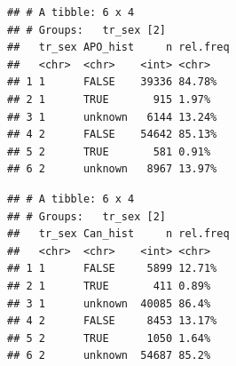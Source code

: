 \documentclass[]{article}
\newenvironment{Shaded}{\begin{snugshade}}{\end{snugshade}}
\newcommand{\DataTypeTok}[1]{\textcolor[rgb]{0.13,0.29,0.53}{#1}}
\newcommand{\DecValTok}[1]{\textcolor[rgb]{0.00,0.00,0.81}{#1}}
\newcommand{\KeywordTok}[1]{\textcolor[rgb]{0.13,0.29,0.53}{\textbf{#1}}}
\newcommand{\NormalTok}[1]{#1}
\newcommand{\OperatorTok}[1]{\textcolor[rgb]{0.81,0.36,0.00}{\textbf{#1}}}
\newcommand{\OtherTok}[1]{\textcolor[rgb]{0.56,0.35,0.01}{#1}}
\newcommand{\StringTok}[1]{\textcolor[rgb]{0.31,0.60,0.02}{#1}}
\begin{document}
\begin{verbatim}
## # A tibble: 6 x 4
## # Groups:   tr_sex [2]
##   tr_sex APO_hist     n rel.freq
##   <chr>  <chr>    <int> <chr>   
## 1 1      FALSE    39336 84.78%  
## 2 1      TRUE       915 1.97%   
## 3 1      unknown   6144 13.24%  
## 4 2      FALSE    54642 85.13%  
## 5 2      TRUE       581 0.91%   
## 6 2      unknown   8967 13.97%
\end{verbatim}

\begin{Shaded}
\end{Shaded}

\begin{verbatim}
## # A tibble: 6 x 4
## # Groups:   tr_sex [2]
##   tr_sex Can_hist     n rel.freq
##   <chr>  <chr>    <int> <chr>   
## 1 1      FALSE     5899 12.71%  
## 2 1      TRUE       411 0.89%   
## 3 1      unknown  40085 86.4%   
## 4 2      FALSE     8453 13.17%  
## 5 2      TRUE      1050 1.64%   
## 6 2      unknown  54687 85.2%
\end{verbatim}

\begin{Shaded}
\end{Shaded}
\end{document}

